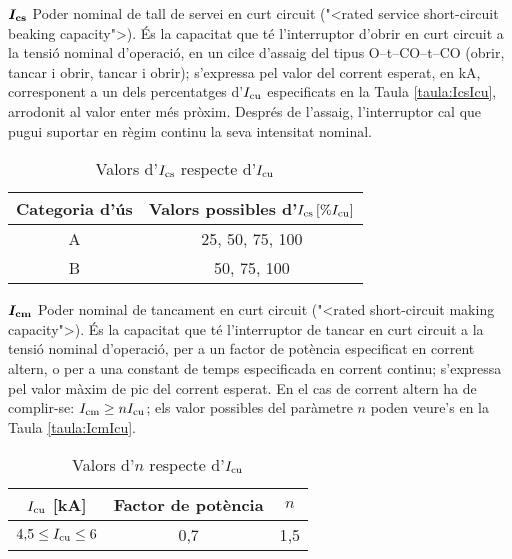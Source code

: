 \begin{list}{}
    \item[$\boldsymbol{I_\mathrm{cs}}$] Poder nominal de tall de servei en curt circuit ({"<}rated service  short-circuit beaking capacity{">}). \'{E}s la capacitat que t\'{e} l'interruptor d'obrir en curt circuit a la tensi\'{o} nominal d'operaci\'{o}, en un cilce d'assaig del tipus O--t--CO--t--CO (obrir, tancar i obrir, tancar i obrir); s'expressa pel valor  del corrent esperat, en kA, corresponent a un dels percentatges d'$I_\mathrm{cu}$ especificats en la Taula \vref{taula:IcsIcu}, arrodonit al valor enter m\'{e}s pr\`{o}xim. Despr\'{e}s de l'assaig, l'interruptor cal que pugui suportar en r\`{e}gim continu la seva intensitat nominal.
         \begin{table}[h]
           \caption{\label{taula:IcsIcu} Valors d'$I_\mathrm{cs}$ respecte d'$I_\mathrm{cu}$}
           \begin{center}\begin{tabular}{cc}
           \toprule[1pt]
           Categoria d'\'{u}s &  Valors possibles d'$I_\mathrm{cs}\, [\% I_\mathrm{cu}]$ \\
           \midrule
           A &  25, 50, 75, 100   \\
           B & 50, 75, 100   \\
           \bottomrule[1pt]
           \end{tabular} \end{center}
         \end{table}
    \item[$\boldsymbol{I_\mathrm{cm}}$] Poder nominal de tancament en curt circuit ({"<}rated short-circuit making capacity{">}). \'{E}s la capacitat que t\'{e} l'interruptor de tancar en curt circuit a la tensi\'{o} nominal d'operaci\'{o}, per a un factor de pot\`{e}ncia especificat en corrent altern, o per a una constant de temps especificada en corrent continu; s'expressa pel valor m\`{a}xim de pic del corrent esperat. En el cas de corrent altern ha de complir-se: $I_\mathrm{cm} \geq n I_\mathrm{cu}$; els valor possibles del par\`{a}metre $n$ poden veure's en la Taula \vref{taula:IcmIcu}.
        \begin{table}[h]
           \caption{\label{taula:IcmIcu} Valors d'$n$ respecte d'$I_\mathrm{cu}$}
           \begin{center}\begin{tabular}{ccc}
           \toprule[1pt]
           $I_\mathrm{cu}$  [kA] &  Factor de pot\`{e}ncia & $n$ \\
           \midrule
           $4{,}5 \leq I_\mathrm{cu} \leq 6$\phantom{0} & 0{,}7\phantom{0}  & 1{,}5   \\

\end{tabular}
\end{center}
\end{table}
\end{list}
